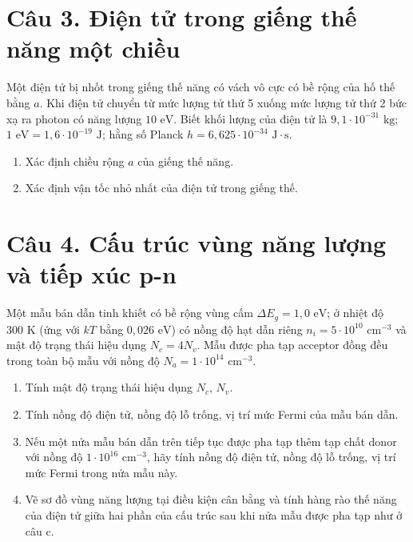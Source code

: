 \documentclass[11pt,a4paper]{article}
\begin{document}
\section*{Câu 3. Điện tử trong giếng thế năng một chiều}

Một điện tử bị nhốt trong giếng thế năng có vách vô cực có bề rộng của hố thế bằng $a$. Khi điện tử chuyển từ mức lượng tử thứ 5 xuống mức lượng tử thứ 2 bức xạ ra photon có năng lượng $10\text{ eV}$. Biết khối lượng của điện tử là $9{,}1 \cdot 10^{-31}\text{ kg}$; $1\text{ eV} = 1{,}6 \cdot 10^{-19}\text{ J}$; hằng số Planck $h = 6{,}625 \cdot 10^{-34}\text{ J}\cdot\text{s}$.

\begin{enumerate}[label=\alph*., leftmargin=*, topsep=2pt, itemsep=1pt, parsep=0pt]
    \item Xác định chiều rộng $a$ của giếng thế năng.
    \item Xác định vận tốc nhỏ nhất của điện tử trong giếng thế.
\end{enumerate}

\section*{Câu 4. Cấu trúc vùng năng lượng và tiếp xúc p-n}

Một mẫu bán dẫn tinh khiết có bề rộng vùng cấm $\Delta E_g = 1{,}0\text{ eV}$; ở nhiệt độ $300\text{ K}$ (ứng với $kT$ bằng $0{,}026\text{ eV}$) có nồng độ hạt dẫn riêng $n_i = 5 \cdot 10^{10}\text{ cm}^{-3}$ và mật độ trạng thái hiệu dụng $N_c = 4N_v$. Mẫu được pha tạp acceptor đồng đều trong toàn bộ mẫu với nồng độ $N_a = 1 \cdot 10^{14}\text{ cm}^{-3}$.

\begin{enumerate}[label=\alph*., leftmargin=*, topsep=2pt, itemsep=1pt, parsep=0pt]
    \item Tính mật độ trạng thái hiệu dụng $N_c$, $N_v$.
    \item Tính nồng độ điện tử, nồng độ lỗ trống, vị trí mức Fermi của mẫu bán dẫn.
    \item Nếu một nửa mẫu bán dẫn trên tiếp tục được pha tạp thêm tạp chất donor với nồng độ $1 \cdot 10^{16}\text{ cm}^{-3}$, hãy tính nồng độ điện tử, nồng độ lỗ trống, vị trí mức Fermi trong nửa mẫu này.
    \item Vẽ sơ đồ vùng năng lượng tại điều kiện cân bằng và tính hàng rào thế năng của điện tử giữa hai phần của cấu trúc sau khi nửa mẫu được pha tạp như ở câu c.
\end{enumerate}
\end{document}
